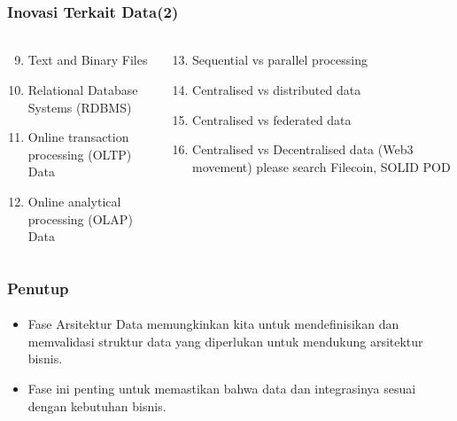 \documentclass[aspectratio=169, table]{beamer}
\begin{document}
		\begin{frame}
		\frametitle{Inovasi Terkait Data(2)}
		\framesubtitle{\hspace{1cm}}
		\begin{columns}
			\begin{column}{0.5\textwidth}
				\begin{center}
					\begin{enumerate}
						\setcounter{enumi}{8}
						\item Text and Binary Files
						\item Relational Database Systems (RDBMS)
						\item Online transaction processing (OLTP) Data
						\item Online analytical processing (OLAP) Data
					\end{enumerate}
				\end{center}
			\end{column}
			\begin{column}{0.5\textwidth}
				\begin{center}
					\begin{enumerate}
						\setcounter{enumi}{12}
						\item Sequential vs parallel processing
						\item Centralised vs distributed data
						\item Centralised vs federated data
						\item Centralised vs Decentralised data (Web3 movement) please search Filecoin, SOLID POD
					\end{enumerate}
				\end{center}
			\end{column}
		\end{columns}
	\end{frame}
	
	
	
	\begin{frame}
		\frametitle{Penutup}
		\framesubtitle{\hspace{1cm}}
		\begin{itemize}
			\item Fase Arsitektur Data memungkinkan kita untuk mendefinisikan dan memvalidasi struktur data yang diperlukan untuk mendukung arsitektur bisnis. 
			\item Fase ini penting untuk memastikan bahwa data dan integrasinya sesuai dengan kebutuhan bisnis.
		\end{itemize}
	\end{frame}
	
	
	
\end{document}
